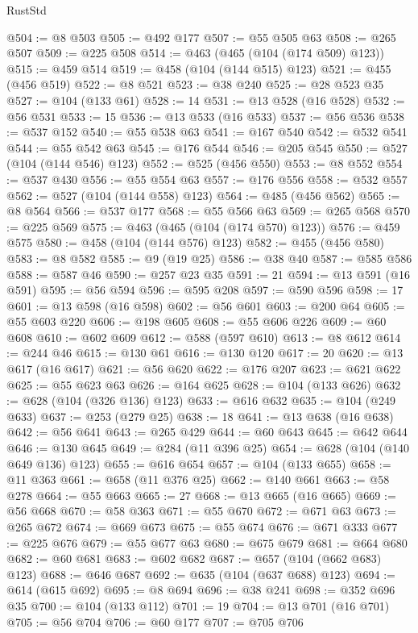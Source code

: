 \begin{lexlean}{RustStd}
\begin{coremodule}
@504 := @8 @503
@505 := @492 @177
@507 := @55 @505 @63
@508 := @265 @507
@509 := @225 @508
@514 := @463 (@465 (@104 (@174 @509) @123))
@515 := @459 @514
@519 := @458 (@104 (@144 @515) @123)
@521 := @455 (@456 @519)
@522 := @8 @521
@523 := @38 @240
@525 := @28 @523 @35
@527 := @104 (@133 @61)
@528 := 14
@531 := @13 @528 (@16 @528)
@532 := @56 @531
@533 := 15
@536 := @13 @533 (@16 @533)
@537 := @56 @536
@538 := @537 @152
@540 := @55 @538 @63
@541 := @167 @540
@542 := @532 @541
@544 := @55 @542 @63
@545 := @176 @544
@546 := @205 @545
@550 := @527 (@104 (@144 @546) @123)
@552 := @525 (@456 @550)
@553 := @8 @552
@554 := @537 @430
@556 := @55 @554 @63
@557 := @176 @556
@558 := @532 @557
@562 := @527 (@104 (@144 @558) @123)
@564 := @485 (@456 @562)
@565 := @8 @564
@566 := @537 @177
@568 := @55 @566 @63
@569 := @265 @568
@570 := @225 @569
@575 := @463 (@465 (@104 (@174 @570) @123))
@576 := @459 @575
@580 := @458 (@104 (@144 @576) @123)
@582 := @455 (@456 @580)
@583 := @8 @582
@585 := @9 (@19 @25)
@586 := @38 @40
@587 := @585 @586
@588 := @587 @46
@590 := @257 @23 @35
@591 := 21
@594 := @13 @591 (@16 @591)
@595 := @56 @594
@596 := @595 @208
@597 := @590 @596
@598 := 17
@601 := @13 @598 (@16 @598)
@602 := @56 @601
@603 := @200 @64
@605 := @55 @603 @220
@606 := @198 @605
@608 := @55 @606 @226
@609 := @60 @608
@610 := @602 @609
@612 := @588 (@597 @610)
@613 := @8 @612
@614 := @244 @46
@615 := @130 @61
@616 := @130 @120
@617 := 20
@620 := @13 @617 (@16 @617)
@621 := @56 @620
@622 := @176 @207
@623 := @621 @622
@625 := @55 @623 @63
@626 := @164 @625
@628 := @104 (@133 @626)
@632 := @628 (@104 (@326 @136) @123)
@633 := @616 @632
@635 := @104 (@249 @633)
@637 := @253 (@279 @25)
@638 := 18
@641 := @13 @638 (@16 @638)
@642 := @56 @641
@643 := @265 @429
@644 := @60 @643
@645 := @642 @644
@646 := @130 @645
@649 := @284 (@11 @396 @25)
@654 := @628 (@104 (@140 @649 @136) @123)
@655 := @616 @654
@657 := @104 (@133 @655)
@658 := @11 @363
@661 := @658 (@11 @376 @25)
@662 := @140 @661
@663 := @58 @278
@664 := @55 @663
@665 := 27
@668 := @13 @665 (@16 @665)
@669 := @56 @668
@670 := @58 @363
@671 := @55 @670
@672 := @671 @63
@673 := @265 @672
@674 := @669 @673
@675 := @55 @674
@676 := @671 @333
@677 := @225 @676
@679 := @55 @677 @63
@680 := @675 @679
@681 := @664 @680
@682 := @60 @681
@683 := @602 @682
@687 := @657 (@104 (@662 @683) @123)
@688 := @646 @687
@692 := @635 (@104 (@637 @688) @123)
@694 := @614 (@615 @692)
@695 := @8 @694
@696 := @38 @241
@698 := @352 @696 @35
@700 := @104 (@133 @112)
@701 := 19
@704 := @13 @701 (@16 @701)
@705 := @56 @704
@706 := @60 @177
@707 := @705 @706

\end{coremodule}
\end{lexlean}
